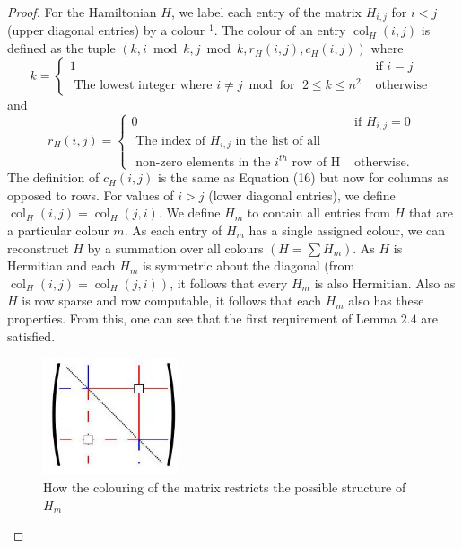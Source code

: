 \documentclass[
10pt, %
a4paper, %
oneside, %
headinclude,footinclude, %
BCOR5mm, %
]{scrartcl}
\begin{document}
\begin{proof}
For the Hamiltonian $H$, we label each entry of the matrix $H_{i, j}$ for $i<j$ (upper diagonal entries) by a colour ${ }^{1}$. The colour of an entry $\operatorname{col}_{H}(i, j)$ is defined as the tuple $\left(k, i \bmod k, j \bmod k, r_{H}(i, j), c_{H}(i, j)\right)$ where
$$
k= \begin{cases}1 & \text { if } i=j \\ \text { The lowest integer where } i \neq j \bmod \text { for } 2 \leq k \leq n^{2} & \text { otherwise }\end{cases}
$$
and
$$
r_{H}(i, j)= \begin{cases}0 & \text { if } H_{i, j}=0 \\ \text { The index of } H_{i, j} \text { in the list of all } \\ \text { non-zero elements in the } i^{t h} \text { row of } \mathrm{H} & \text { otherwise. }\end{cases}
$$
The definition of $c_{H}(i, j)$ is the same as Equation (16) but now for columns as opposed to rows. For values of $i>j$ (lower diagonal entries), we define $\operatorname{col}_{H}(i, j)=\operatorname{col}_{H}(j, i)$. We define $H_{m}$ to contain all entries from $H$ that are a particular colour $m$. As each entry of $H_{m}$ has a single assigned colour, we can reconstruct $H$ by a summation over all colours $\left(H=\sum H_{m}\right)$. As $H$ is Hermitian and each $H_{m}$ is symmetric about the diagonal (from $\left.\operatorname{col}_{H}(i, j)=\operatorname{col}_{H}(j, i)\right)$, it follows that every $H_{m}$ is also Hermitian. Also as $H$ is row sparse and row computable, it follows that each $H_{m}$ also has these properties. From this, one can see that the first requirement of Lemma $2.4$ are satisfied.

\begin{figure}[H]
    \centering
    \includegraphics[width=40mm]{images/graph-matrix.jpg}
    \caption{How the colouring of the matrix restricts the possible structure of $H_{m}$}
    \label{fig:my_label}
\end{figure}


\end{proof}
\end{document}
